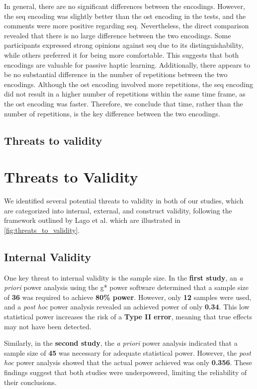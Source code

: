 In general, there are no significant differences between the encodings. However, the \gls{seq} encoding was slightly better than the \gls{ost} encoding in the tests, and the comments were more positive regarding \gls{seq}. Nevertheless, the direct comparison revealed that there is no large difference between the two encodings. Some participants expressed strong opinions against \gls{seq} due to its distinguishability, while others preferred it for being more comfortable. This suggests that both encodings are valuable for passive haptic learning. Additionally, there appears to be no substantial difference in the number of repetitions between the two encodings. Although the \gls{ost} encoding involved more repetitions, the \gls{seq} encoding did not result in a higher number of repetitions within the same time frame, as the \gls{ost} encoding was faster. Therefore, we conclude that time, rather than the number of repetitions, is the key difference between the two encodings.


\subsection{Threats to validity}
\section{Threats to Validity}

We identified several potential threats to validity in both of our studies, which are categorized into internal, external, and construct validity, following the framework outlined by Lago et al. \cite{10.1145/3674805.3686691} which are illustrated in \autoref{fig:threats_to_validity}.

\subsection{Internal Validity}
One key threat to internal validity is the sample size. In the \textbf{first study}, an \textit{a priori} power analysis using the g* power software determined that a sample size of \textbf{36} was required to achieve \textbf{80\% power}. However, only \textbf{12} samples were used, and a \textit{post hoc} power analysis revealed an achieved power of only \textbf{0.34}. This low statistical power increases the risk of a \textbf{Type II error}, meaning that true effects may not have been detected. 

Similarly, in the \textbf{second study}, the \textit{a priori} power analysis indicated that a sample size of \textbf{45} was necessary for adequate statistical power. However, the \textit{post hoc} power analysis showed that the actual power achieved was only \textbf{0.356}. These findings suggest that both studies were underpowered, limiting the reliability of their conclusions.

